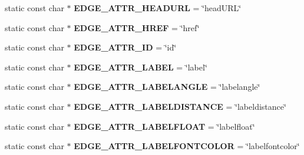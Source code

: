 \begin{DoxyCompactItemize}
\item 
static const char $\ast$ {\bfseries E\+D\+G\+E\+\_\+\+A\+T\+T\+R\+\_\+\+H\+E\+A\+D\+U\+RL} = \char`\"{}head\+U\+RL\char`\"{}\hypertarget{classmemgraph_1_1_graphviz_attrs_abd5d187e25cb5f3f852d603c4b519b68}{}\label{classmemgraph_1_1_graphviz_attrs_abd5d187e25cb5f3f852d603c4b519b68}

\item 
static const char $\ast$ {\bfseries E\+D\+G\+E\+\_\+\+A\+T\+T\+R\+\_\+\+H\+R\+EF} = \char`\"{}href\char`\"{}\hypertarget{classmemgraph_1_1_graphviz_attrs_af5ab158cff0179a46a2ac953c321dcf7}{}\label{classmemgraph_1_1_graphviz_attrs_af5ab158cff0179a46a2ac953c321dcf7}

\item 
static const char $\ast$ {\bfseries E\+D\+G\+E\+\_\+\+A\+T\+T\+R\+\_\+\+ID} = \char`\"{}id\char`\"{}\hypertarget{classmemgraph_1_1_graphviz_attrs_adddfcb1c259d80e81b5ac3cce382da6b}{}\label{classmemgraph_1_1_graphviz_attrs_adddfcb1c259d80e81b5ac3cce382da6b}

\item 
static const char $\ast$ {\bfseries E\+D\+G\+E\+\_\+\+A\+T\+T\+R\+\_\+\+L\+A\+B\+EL} = \char`\"{}label\char`\"{}\hypertarget{classmemgraph_1_1_graphviz_attrs_a63689258535cd01189d859655664f768}{}\label{classmemgraph_1_1_graphviz_attrs_a63689258535cd01189d859655664f768}

\item 
static const char $\ast$ {\bfseries E\+D\+G\+E\+\_\+\+A\+T\+T\+R\+\_\+\+L\+A\+B\+E\+L\+A\+N\+G\+LE} = \char`\"{}labelangle\char`\"{}\hypertarget{classmemgraph_1_1_graphviz_attrs_a2b0c6cc60513083481323026493854f9}{}\label{classmemgraph_1_1_graphviz_attrs_a2b0c6cc60513083481323026493854f9}

\item 
static const char $\ast$ {\bfseries E\+D\+G\+E\+\_\+\+A\+T\+T\+R\+\_\+\+L\+A\+B\+E\+L\+D\+I\+S\+T\+A\+N\+CE} = \char`\"{}labeldistance\char`\"{}\hypertarget{classmemgraph_1_1_graphviz_attrs_a94fb101ed73fc0cba58667018c11459d}{}\label{classmemgraph_1_1_graphviz_attrs_a94fb101ed73fc0cba58667018c11459d}

\item 
static const char $\ast$ {\bfseries E\+D\+G\+E\+\_\+\+A\+T\+T\+R\+\_\+\+L\+A\+B\+E\+L\+F\+L\+O\+AT} = \char`\"{}labelfloat\char`\"{}\hypertarget{classmemgraph_1_1_graphviz_attrs_aaf8b2b481d33a2a84c78fa5cf9e0a63f}{}\label{classmemgraph_1_1_graphviz_attrs_aaf8b2b481d33a2a84c78fa5cf9e0a63f}

\item 
static const char $\ast$ {\bfseries E\+D\+G\+E\+\_\+\+A\+T\+T\+R\+\_\+\+L\+A\+B\+E\+L\+F\+O\+N\+T\+C\+O\+L\+OR} = \char`\"{}labelfontcolor\char`\"{}\hypertarget{classmemgraph_1_1_graphviz_attrs_a1220336c11ba3e5dcc0b4c032aac4e13}{}\label{classmemgraph_1_1_graphviz_attrs_a1220336c11ba3e5dcc0b4c032aac4e13}


\end{DoxyCompactItemize}
